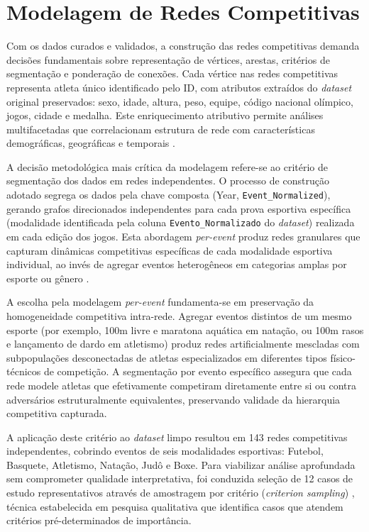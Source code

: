 \section{Modelagem de Redes Competitivas}

Com os dados curados e validados, a construção das redes competitivas demanda decisões fundamentais sobre representação de vértices, arestas, critérios de segmentação e ponderação de conexões. Cada vértice nas redes competitivas representa atleta único identificado pelo ID, com atributos extraídos do \textit{dataset} original preservados: sexo, idade, altura, peso, equipe, código nacional olímpico, jogos, cidade e medalha. Este enriquecimento atributivo permite análises multifacetadas que correlacionam estrutura de rede com características demográficas, geográficas e temporais \cite{Sousa2018Computational}. 

A decisão metodológica mais crítica da modelagem refere-se ao critério de segmentação dos dados em redes independentes. O processo de construção adotado segrega os dados pela chave composta (Year, \texttt{Event\_Normalized}), gerando grafos direcionados independentes para cada prova esportiva específica (modalidade identificada pela coluna \texttt{Evento\_Normalizado} do \textit{dataset}) realizada em cada edição dos jogos. Esta abordagem \textit{per-event} produz redes granulares que capturam dinâmicas competitivas específicas de cada modalidade esportiva individual, ao invés de agregar eventos heterogêneos em categorias amplas por esporte ou gênero \cite{Radicchi2016OlympicDominance}.

A escolha pela modelagem \textit{per-event} fundamenta-se em preservação da homogeneidade competitiva intra-rede. Agregar eventos distintos de um mesmo esporte (por exemplo, 100m livre e maratona aquática em natação, ou 100m rasos e lançamento de dardo em atletismo) produz redes artificialmente mescladas com subpopulações desconectadas de atletas especializados em diferentes tipos físico-técnicos de competição. A segmentação por evento específico assegura que cada rede modele atletas que efetivamente competiram diretamente entre si ou contra adversários estruturalmente equivalentes, preservando validade da hierarquia competitiva capturada.

A aplicação deste critério ao \textit{dataset} limpo resultou em 143 redes competitivas independentes, cobrindo eventos de seis modalidades esportivas: Futebol, Basquete, Atletismo, Natação, Judô e Boxe. Para viabilizar análise aprofundada sem comprometer qualidade interpretativa, foi conduzida seleção de 12 casos de estudo representativos através de amostragem por critério (\textit{criterion sampling}) \cite{Palinkas2015Purposeful}, técnica estabelecida em pesquisa qualitativa que identifica casos que atendem critérios pré-determinados de importância.

